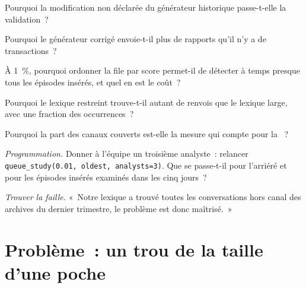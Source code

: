 \begin{exercise}[$\star$]\label{exo:pl:surveillance-and-compliance-technology:2}
Pourquoi la modification non déclarée du générateur historique passe-t-elle la validation~?
\end{exercise}

\begin{exercise}[$\star$]\label{exo:pl:surveillance-and-compliance-technology:3}
Pourquoi le générateur corrigé envoie-t-il plus de rapports qu'il n'y a de transactions~?
\end{exercise}

\begin{exercise}[$\star\star$]\label{exo:pl:surveillance-and-compliance-technology:4}
À 1~\%, pourquoi ordonner la file par score permet-il de détecter à temps presque tous les épisodes insérés, et quel en est le coût~?
\end{exercise}

\begin{exercise}[$\star\star$]\label{exo:pl:surveillance-and-compliance-technology:5}
Pourquoi le lexique restreint trouve-t-il autant de renvois que le lexique large, avec une fraction des occurrences~?
\end{exercise}

\begin{exercise}[$\star\star$]\label{exo:pl:surveillance-and-compliance-technology:6}
Pourquoi la part des canaux couverts est-elle la mesure qui compte pour la ~?
\end{exercise}

\begin{exercise}[$\star\star\star$]\label{exo:pl:surveillance-and-compliance-technology:7}
\emph{Programmation.} Donner à l'équipe un troisième analyste~: relancer \texttt{queue\_study(0.01, \textquotedbl oldest\textquotedbl, analysts=3)}.
Que se passe-t-il pour l'arriéré et pour les épisodes insérés examinés dans les cinq jours~?
\end{exercise}

\begin{exercise}[$\star\star\star$]\label{exo:pl:surveillance-and-compliance-technology:8}
\emph{Trouver la faille.} «~Notre lexique a trouvé toutes les conversations hors canal des archives du dernier trimestre, le problème est
donc maîtrisé.~»
\end{exercise}

\section{Problème~: un trou de la taille d'une poche}

